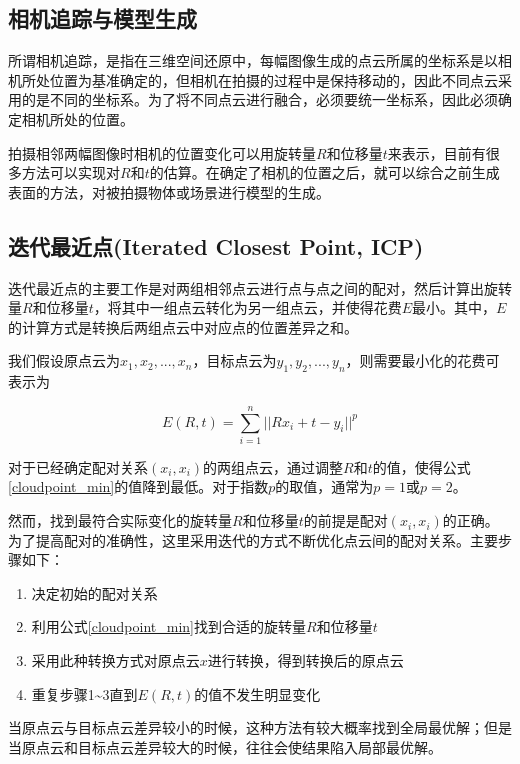 \documentclass{llncs}
\begin{document}
\begin{CJK}{UTF8}{song}
\section{相机追踪与模型生成}

所谓相机追踪，是指在三维空间还原中，每幅图像生成的点云所属的坐标系是以相机所处位置为基准确定的，但相机在拍摄的过程中是保持移动的，因此不同点云采用的是不同的坐标系。为了将不同点云进行融合，必须要统一坐标系，因此必须确定相机所处的位置。

拍摄相邻两幅图像时相机的位置变化可以用旋转量$R$和位移量$t$来表示，目前有很多方法可以实现对$R$和$t$的估算。在确定了相机的位置之后，就可以综合之前生成表面的方法，对被拍摄物体或场景进行模型的生成。

	\subsection{迭代最近点(Iterated Closest Point, ICP)}

迭代最近点的主要工作是对两组相邻点云进行点与点之间的配对，然后计算出旋转量$R$和位移量$t$，将其中一组点云转化为另一组点云，并使得花费$E$最小\cite{DBLP:journals/pami/BeslM92}。其中，$E$的计算方式是转换后两组点云中对应点的位置差异之和。

我们假设原点云为$x_1,x_2,...,x_n$，目标点云为$y_1,y_2,...,y_n$，则需要最小化的花费可表示为

\begin{equation}
\label{cloudpoint_min}
	E(R,t) = \sum_{i=1}^n||Rx_i+t-y_i||^p
\end{equation}

对于已经确定配对关系$(x_i,x_i)$的两组点云，通过调整$R$和$t$的值，使得公式\ref{cloudpoint_min}的值降到最低。对于指数$p$的取值，通常为$p=1$或$p=2$。

然而，找到最符合实际变化的旋转量$R$和位移量$t$的前提是配对$(x_i,x_i)$的正确。为了提高配对的准确性，这里采用迭代的方式不断优化点云间的配对关系。主要步骤如下：

\begin{enumerate}
\item{决定初始的配对关系}
\item{利用公式\ref{cloudpoint_min}找到合适的旋转量$R$和位移量$t$}
\item{采用此种转换方式对原点云$x$进行转换，得到转换后的原点云}
\item{重复步骤1\~{}3直到$E(R,t)$的值不发生明显变化}
\end{enumerate}

当原点云与目标点云差异较小的时候，这种方法有较大概率找到全局最优解；但是当原点云和目标点云差异较大的时候，往往会使结果陷入局部最优解。


\end{CJK}
\end{document}
